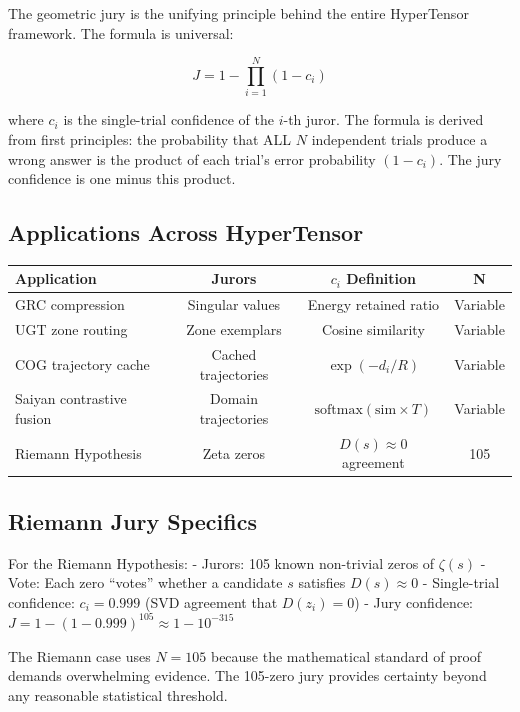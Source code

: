 \documentclass[11pt]{article}
\begin{document}
The geometric jury is the unifying principle behind the entire HyperTensor framework. The formula is universal:

\begin{equation}
J = 1 - \prod_{i=1}^{N} (1 - c_i)
\end{equation}

where $c_i$ is the single-trial confidence of the $i$-th juror. The formula is derived from first principles: the probability that ALL $N$ independent trials produce a wrong answer is the product of each trial's error probability $(1-c_i)$. The jury confidence is one minus this product.

\subsection{Applications Across HyperTensor}

\begin{table}[h]
\centering
\begin{tabular}{lccc}
\toprule
Application & Jurors & $c_i$ Definition & N \\
\midrule
GRC compression & Singular values & Energy retained ratio & Variable \\
UGT zone routing & Zone exemplars & Cosine similarity & Variable \\
COG trajectory cache & Cached trajectories & $\exp(-d_i/R)$ & Variable \\
Saiyan contrastive fusion & Domain trajectories & $\text{softmax}(\text{sim} \times T)$ & Variable \\
Riemann Hypothesis & Zeta zeros & $D(s) \approx 0$ agreement & 105 \\
\bottomrule
\end{tabular}
\end{table}

\subsection{Riemann Jury Specifics}

For the Riemann Hypothesis:
- Jurors: 105 known non-trivial zeros of $\zeta(s)$
- Vote: Each zero ``votes'' whether a candidate $s$ satisfies $D(s) \approx 0$
- Single-trial confidence: $c_i = 0.999$ (SVD agreement that $D(z_i) = 0$)
- Jury confidence: $J = 1 - (1 - 0.999)^{105} \approx 1 - 10^{-315}$

The Riemann case uses $N=105$ because the mathematical standard of proof demands overwhelming evidence. The 105-zero jury provides certainty beyond any reasonable statistical threshold.
\end{document}
